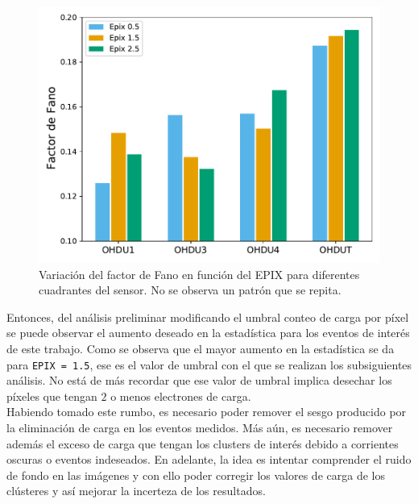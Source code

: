 \begin{figure}[h]
    \centering
    \includegraphics[scale=0.5]{Figs/Fano_vs_Epix.pdf}
    \caption{\footnotesize{Variación del factor de Fano en función del EPIX para diferentes cuadrantes del sensor. No se observa un patrón que se repita.}}
    \label{fig:FanoVsEpix}
\end{figure}
Entonces, del análisis preliminar modificando el umbral conteo de carga por píxel se puede observar el aumento deseado en la estadística para los eventos de interés de este trabajo. Como se observa que el mayor aumento en la estadística se da para \verb|EPIX = 1.5|, ese es el valor de umbral con el que se realizan los subsiguientes análisis. No está de más recordar que ese valor de umbral implica desechar los píxeles que tengan $2$ o menos electrones de carga.\\
\indent Habiendo tomado este rumbo, es necesario poder remover el sesgo producido por la eliminación de carga en los eventos medidos. Más aún, es necesario remover además el exceso de carga que tengan los clusters de interés debido a corrientes oscuras o eventos indeseados.  En adelante, la idea es intentar comprender el ruido de fondo en las imágenes y con ello poder corregir los valores de carga de los clústeres y así mejorar la incerteza de los resultados.


